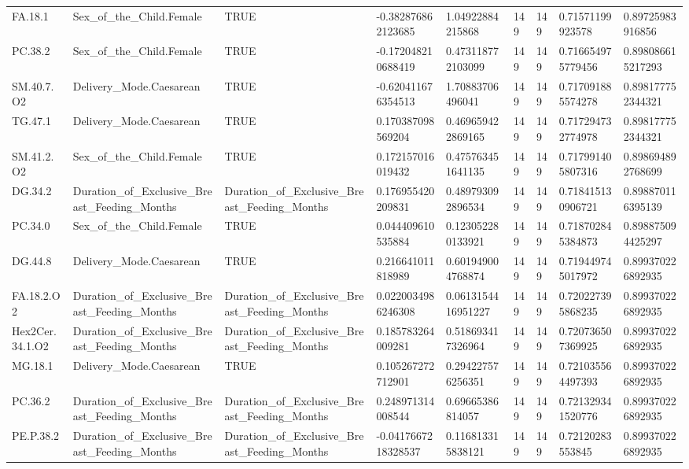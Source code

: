 \begin{longtable}{lllllllll}
FA.18.1 & Sex\_of\_the\_Child.Female & TRUE & -0.382876862123685 & 1.04922884215868 & 149 & 149 & 0.71571199923578 & 0.89725983916856 \\
PC.38.2 & Sex\_of\_the\_Child.Female & TRUE & -0.172048210688419 & 0.473118772103099 & 149 & 149 & 0.716654975779456 & 0.898086615217293 \\
SM.40.7.O2 & Delivery\_Mode.Caesarean & TRUE & -0.620411676354513 & 1.70883706496041 & 149 & 149 & 0.717091885574278 & 0.898177752344321 \\
TG.47.1 & Delivery\_Mode.Caesarean & TRUE & 0.170387098569204 & 0.469659422869165 & 149 & 149 & 0.717294732774978 & 0.898177752344321 \\
SM.41.2.O2 & Sex\_of\_the\_Child.Female & TRUE & 0.172157016019432 & 0.475763451641135 & 149 & 149 & 0.717991405807316 & 0.898694892768699 \\
DG.34.2 & Duration\_of\_Exclusive\_Breast\_Feeding\_Months & Duration\_of\_Exclusive\_Breast\_Feeding\_Months & 0.176955420209831 & 0.489793092896534 & 149 & 149 & 0.718415130906721 & 0.898870116395139 \\
PC.34.0 & Sex\_of\_the\_Child.Female & TRUE & 0.044409610535884 & 0.123052280133921 & 149 & 149 & 0.718702845384873 & 0.898875094425297 \\
DG.44.8 & Delivery\_Mode.Caesarean & TRUE & 0.216641011818989 & 0.601949004768874 & 149 & 149 & 0.719449745017972 & 0.899370226892935 \\
FA.18.2.O2 & Duration\_of\_Exclusive\_Breast\_Feeding\_Months & Duration\_of\_Exclusive\_Breast\_Feeding\_Months & 0.0220034986246308 & 0.0613154416951227 & 149 & 149 & 0.720227395868235 & 0.899370226892935 \\
Hex2Cer.34.1.O2 & Duration\_of\_Exclusive\_Breast\_Feeding\_Months & Duration\_of\_Exclusive\_Breast\_Feeding\_Months & 0.185783264009281 & 0.518693417326964 & 149 & 149 & 0.720736507369925 & 0.899370226892935 \\
MG.18.1 & Delivery\_Mode.Caesarean & TRUE & 0.105267272712901 & 0.294227576256351 & 149 & 149 & 0.721035564497393 & 0.899370226892935 \\
PC.36.2 & Duration\_of\_Exclusive\_Breast\_Feeding\_Months & Duration\_of\_Exclusive\_Breast\_Feeding\_Months & 0.248971314008544 & 0.69665386814057 & 149 & 149 & 0.721329341520776 & 0.899370226892935 \\
PE.P.38.2 & Duration\_of\_Exclusive\_Breast\_Feeding\_Months & Duration\_of\_Exclusive\_Breast\_Feeding\_Months & -0.0417667218328537 & 0.116813315838121 & 149 & 149 & 0.72120283553845 & 0.899370226892935 \\

\end{longtable}
